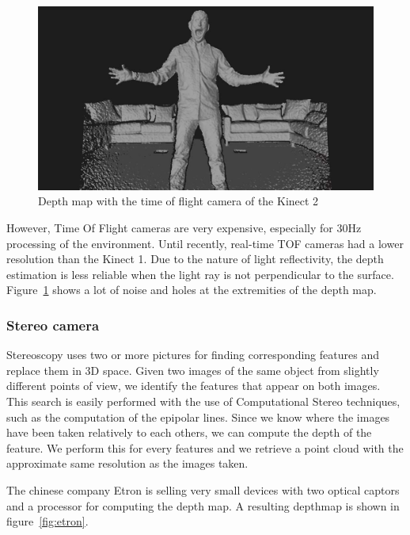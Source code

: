 \documentclass[12pt]{article}
\begin{document}
\begin{figure}[h]
  \centering
  \includegraphics[scale=0.3]{kinect2depth.jpg}
  \caption{\label{fig:depthK2} Depth map with the time of flight camera of the Kinect 2}
\end{figure}

However, Time Of Flight cameras are very expensive, especially for 30Hz processing of the environment. Until recently, real-time TOF cameras had a lower resolution than the Kinect 1. Due to the nature of light reflectivity, the depth estimation is less reliable when the light ray is not perpendicular to the surface. Figure~\ref{fig:depthK2} shows a lot of noise and holes at the extremities of the depth map.

\subsubsection{Stereo camera}
\label{subsec:stereocam}
Stereoscopy uses two or more pictures for finding corresponding features and replace them in 3D space. Given two images of the same object from slightly different points of view, we identify the features that appear on both images. This search is easily performed with the use of Computational Stereo techniques, such as the computation of the epipolar lines. Since we know where the images have been taken relatively to each others, we can compute the depth of the feature. We perform this for every features and we retrieve a point cloud with the approximate same resolution as the images taken.

The chinese company Etron is selling very small devices with two optical captors and a processor for computing the depth map. A resulting depthmap is shown in figure~\ref{fig:etron}.
\end{document}
